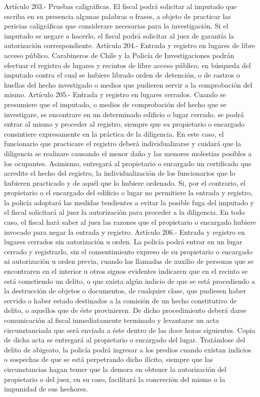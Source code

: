     Artículo 203.- Pruebas caligráficas. El fiscal podrá solicitar al imputado que escriba en su presencia algunas palabras o frases, a objeto de practicar las pericias caligráficas que considerare necesarias para la investigación. Si el imputado se negare a hacerlo, el fiscal podrá solicitar al juez de garantía la autorización correspondiente.
    Artículo 204.- Entrada y registro en lugares de libre acceso público. Carabineros de Chile y la Policía de Investigaciones podrán efectuar el registro de lugares y recintos de libre acceso público, en búsqueda del imputado contra el cual se hubiere librado orden de detención, o de rastros o huellas del hecho investigado o medios que pudieren servir a la comprobación del mismo.
    Artículo 205.- Entrada y registro en lugares cerrados. Cuando se presumiere que el imputado, o medios de comprobación del hecho que se investigare, se encontrare en un determinado edificio o lugar cerrado, se podrá entrar al mismo y proceder al registro, siempre que su propietario o encargado consintiere expresamente en la práctica de la diligencia.
    En este caso, el funcionario que practicare el registro deberá individualizarse y cuidará que la diligencia se realizare causando el menor daño y las menores molestias posibles a los ocupantes. Asimismo, entregará al propietario o encargado un certificado que acredite el hecho del registro, la individualización de los funcionarios que lo hubieren practicado y de aquél que lo hubiere ordenado.
    Si, por el contrario, el propietario o el encargado del edificio o lugar no permitiere la entrada y registro, la policía adoptará las medidas tendientes a evitar la posible fuga del imputado y el fiscal solicitará al juez la autorización para proceder a la diligencia. En todo caso, el fiscal hará saber al juez las razones que el propietario o encargado hubiere invocado para negar la entrada y registro.
    Artículo 206.- Entrada y registro en lugares cerrados sin autorización u orden. La policía podrá entrar en un lugar cerrado y registrarlo, sin el consentimiento expreso de su propietario o encargado ni autorización u orden previa, cuando las llamadas de auxilio de personas que se encontraren en el interior u otros signos evidentes indicaren que en el recinto se está cometiendo un delito, o que exista algún indicio de que se está procediendo a la destrucción de objetos o documentos, de cualquier clase, que pudiesen haber servido o haber estado destinados a la comisión de un hecho constitutivo de delito, o aquellos que de éste provinieren.
    De dicho procedimiento deberá darse comunicación al fiscal inmediatamente terminado y levantarse un acta circunstanciada que será enviada a éste dentro de las doce horas siguientes. Copia de dicha acta se entregará al propietario o encargado del lugar.
    Tratándose del delito de abigeato, la policía podrá ingresar a los predios cuando existan indicios o sospechas de que se está perpetrando dicho ilícito, siempre que las circunstancias hagan temer que la demora en obtener la autorización del propietario o del juez, en su caso, facilitará la concreción del mismo o la impunidad de sus hechores.






